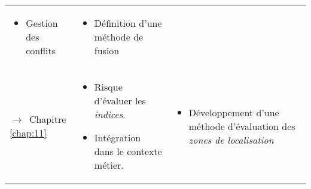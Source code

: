 \begin{tabular}{L{.2\textheight}L{.35\textheight}L{.35\textheight}}
\begin{minipage}[t]{.35\textheight}
\begin{itemize}
    \item Gestion des conflits
    \end{itemize}
  \end{minipage}& \begin{minipage}[t]{.35\textheight}
    \begin{itemize}
    \item Définition d'une méthode de fusion
    \end{itemize}
  \end{minipage} \\
  \addlinespace[.5cm]
{\par\footnotesize\hspace{.25cm}$\longrightarrow$~Chapitre
\ref{chap:11}} & \begin{minipage}[t]{.35\textheight} \small
    \begin{itemize}
    \item Risque d'évaluer les \emph{indices}.
    \item Intégration dans le contexte métier.
    \end{itemize}
  \end{minipage}& \begin{minipage}[t]{.35\textheight}
    \begin{itemize}
    \item Développement d'une méthode d'évaluation des \emph{zones de
        localisation}
    \end{itemize}
  \end{minipage}\\
  \bottomrule
\end{tabular}
